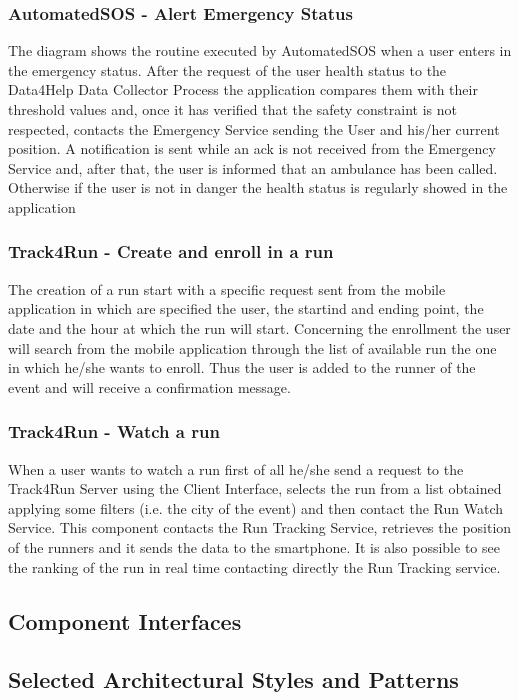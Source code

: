 \documentclass[a4paper]{article}
\begin{document}
\subsubsection{AutomatedSOS - Alert Emergency Status}
The diagram shows the routine executed by AutomatedSOS when a user enters in the emergency status. After the request of the user health status to the Data4Help Data Collector Process the application compares them with their threshold values and, once it has verified that the safety constraint is not respected, contacts the Emergency Service sending the User and his/her current position. A notification is sent while an ack is not received from the Emergency Service and, after that, the user is informed that an ambulance has been called. Otherwise if the user is not in danger the health status is regularly showed in the application

\subsubsection{Track4Run - Create and enroll in a run}
The creation of a run start with a specific request sent from the mobile application in which are specified the user, the startind and ending point, the date and the hour at which the run will start.
Concerning the enrollment the user will search from the mobile application through the list of available run the one in which he/she wants to enroll. Thus the user is added to the runner of the event and will receive a confirmation message.

\subsubsection{Track4Run - Watch a run}
When a user wants to watch a run first of all he/she send a request to the Track4Run Server using the Client Interface, selects the run from a list obtained applying some filters (i.e. the city of the event) and then contact the Run Watch Service. This component contacts the Run Tracking Service, retrieves the position of the runners and it sends the data to the smartphone. It is also possible to see the ranking of the run in real time contacting directly the Run Tracking service.

\subsection{Component Interfaces}

\subsection{Selected Architectural Styles and Patterns}
\end{document}
